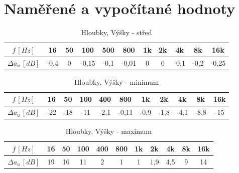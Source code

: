 \documentclass[12pt]{article} %
\begin{document}
\section{Naměřené a vypočítané hodnoty}
\begin{table}[H]
\caption{Hloubky, Výšky - střed}
\begin{tabular}{|c|c|c|c|c|c|c|c|c|c|c|}
\hline 
$f\,[Hz]$ & 16 & 50 & 100 & 500 & 800 & 1k & 2k & 4k & 8k & 16k \\ 
\hline 
$\Delta a_u\,[dB]$ & -0,4 & 0 & -0,15 & -0,1 & -0,01 & 0 & 0 & -0,1 & -0,2 & -0,25 \\ 
\hline 
\end{tabular} 
\end{table}

\begin{table}[H]
\caption{Hloubky, Výšky - minimum}
\begin{tabular}{|c|c|c|c|c|c|c|c|c|c|c|}
\hline 
$f\,[Hz]$ & 16 & 50 & 100 & 400 & 800 & 1k & 2k & 4k & 8k & 16k \\ 
\hline 
$\Delta a_u\,[dB]$ & -22 & -18 & -11 & -2,1 & -0,11 & -0,9 & -1,8 & -4,1 & -8,8 & -15 \\ 
\hline 
\end{tabular} 
\end{table}

\begin{table}[H]
\caption{Hloubky, Výšky - maximum}
\begin{tabular}{|c|c|c|c|c|c|c|c|c|c|c|}
\hline 
$f\,[Hz]$ & 16 & 50 & 100 & 400 & 800 & 1k & 2k & 4k & 8k & 16k \\ 
\hline 
$\Delta a_u\,[dB]$ & 19 & 16 & 11 & 2 & 1 & 1 & 1,9 & 4,5 & 9 & 14 \\ 
\hline 
\end{tabular} 
\end{table}
\end{document}

